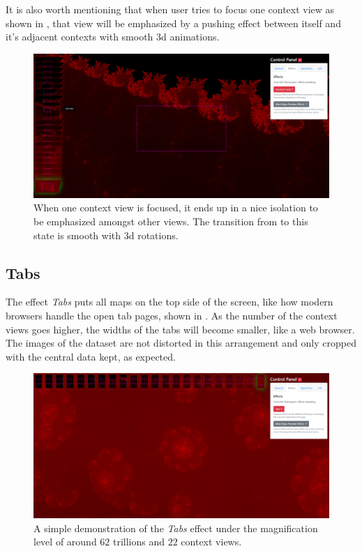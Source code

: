 It is also worth mentioning that when user tries to focus one context view as shown in , that view will be emphasized by a pushing effect between itself and it's adjacent contexts with smooth 3d animations.

\begin{figure}[H]
\centering
\includegraphics[width=\textwidth,keepaspectratio]{Figures/Chapter5/cards2.png}
\decoRule
\caption[Stacked Cards Effect with One Focused Context View]{When one context view is focused, it ends up in a nice isolation to be emphasized amongst other views. The transition from  to this state is smooth with 3d rotations.}
\label{fig:chap5:cards2}
\end{figure}

\subsection{Tabs}
\label{chap5:tabs}

The effect \emph{Tabs} puts all \glspl{map} on the top side of the screen, like how modern browsers handle the open tab pages, shown in . As the number of the context views goes higher, the widths of the tabs will become smaller, like a web browser. The images of the dataset are not distorted in this arrangement and only cropped with the central data kept, as expected.

\begin{figure}[H]
\centering
\includegraphics[width=\textwidth,keepaspectratio]{Figures/Chapter5/tabs.png}
\decoRule
\caption[Tabs Effect]{A simple demonstration of the \emph{Tabs} effect under the magnification level of around $62$ trillions and $22$ context views.}
\label{fig:chap5:tabs}
\end{figure}

